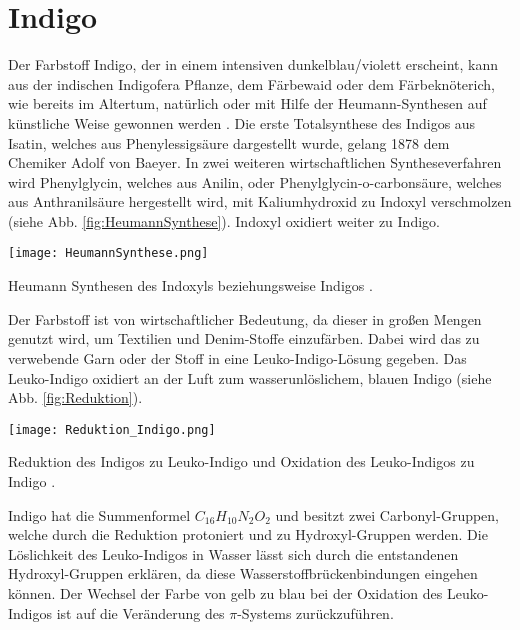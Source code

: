 \section{Indigo}

Der Farbstoff Indigo, der in einem intensiven dunkelblau/violett erscheint, kann aus der indischen Indigofera Pflanze, dem Färbewaid oder dem Färbeknöterich, wie bereits im Altertum, natürlich oder mit Hilfe der Heumann-Synthesen auf künstliche Weise gewonnen werden \cite{Schmidt,Steingruber}. Die erste Totalsynthese des Indigos aus Isatin, welches aus Phenylessigsäure dargestellt wurde, gelang 1878 dem Chemiker Adolf von Baeyer. In zwei weiteren wirtschaftlichen Syntheseverfahren wird Phenylglycin, welches aus Anilin, oder Phenylglycin-o-carbonsäure, welches aus Anthranilsäure hergestellt wird, mit Kaliumhydroxid zu Indoxyl verschmolzen (siehe Abb. \ref{fig:HeumannSynthese}). Indoxyl oxidiert weiter zu Indigo.

\begin{dsafigure}
 \centering
 \texttt{[image: HeumannSynthese.png]}
 \caption{Heumann Synthesen des Indoxyls beziehungsweise Indigos \cite{HeumannSynthese}.}
 \label{fig:HeumannSynthese}
\end{dsafigure}

Der Farbstoff ist von wirtschaftlicher Bedeutung, da dieser in großen Mengen genutzt wird, um Textilien und Denim-Stoffe einzufärben. Dabei wird das zu verwebende Garn oder der Stoff in eine Leuko-Indigo-Lösung gegeben. Das Leuko-Indigo oxidiert an der Luft zum wasserunlöslichem, blauen Indigo (siehe Abb. \ref{fig:Reduktion}).

\begin{dsafigure}
 \centering
 \texttt{[image: Reduktion\_Indigo.png]}
 \caption{Reduktion des Indigos zu Leuko-Indigo und Oxidation des Leuko-Indigos zu Indigo \cite{Indigo_Reduktion}.}
 \label{fig:Reduktion}
\end{dsafigure}

Indigo hat die Summenformel $C_{16}H_{10}N_{2}O_{2}$ und besitzt zwei Carbonyl-Gruppen, welche durch die Reduktion protoniert und zu Hydroxyl-Gruppen werden.
Die Löslichkeit des Leuko-Indigos in Wasser lässt sich durch die entstandenen Hydroxyl-Gruppen erklären, da diese Wasserstoffbrückenbindungen eingehen können.
Der Wechsel der Farbe von gelb zu blau bei der Oxidation des Leuko-Indigos ist auf die Veränderung des $\pi$-Systems zurückzuführen.
 
